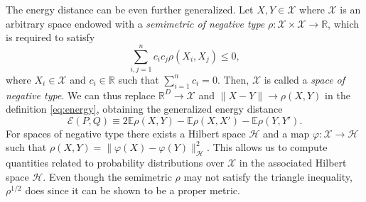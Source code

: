 \documentclass[aps,preprint,nofootinbib,floatfix]{revtex4-1}
\newcommand\Energy{\mathcal{E}}
\newcommand\E{\mathbb{E}}
\begin{document}
The energy distance can be even further generalized.
Let $X, Y \in \mathcal{X}$  where $\mathcal{X}$ is an arbitrary space endowed
with a \emph{semimetric of negative type}
$\rho: \mathcal{X}\times\mathcal{X} \to \mathbb{R}$, which is required
to satisfy
\begin{equation}
\label{eq:negative_type}
\sum_{i,j=1}^n c_i c_j \rho(X_i, X_j) \le 0,
\end{equation}
where $X_i \in \mathcal{X}$ and $c_i \in \mathbb{R}$ such that
$\sum_{i=1}^n c_i = 0$. Then, $\mathcal{X}$ is called a \emph{space of
negative type}.
We can thus replace $\mathbb{R}^D \to \mathcal{X}$ and 
$\| X - Y \| \to \rho(X , Y)$ in the definition \eqref{eq:energy}, obtaining
the generalized energy distance
\begin{equation}
\label{eq:energy3}
\Energy(P, Q) \equiv 2 \E \rho(X,Y) - \E \rho(X, X') - \E \rho(Y,Y').
\end{equation}
For spaces of negative type there exists a Hilbert space $\mathcal{H}$ and
a map $\varphi: \mathcal{X} \to
\mathcal{H}$ such that
$\rho(X, Y) = \| \varphi(X) - \varphi(Y) \|_{\mathcal{H}}^2$. This
allows us to compute quantities related to probability distributions over
$\mathcal{X}$ in the associated Hilbert space $\mathcal{H}$.
Even though the semimetric 
$\rho$ may not satisfy the triangle inequality, 
$\rho^{1/2}$ does since it can be shown to be a proper metric. 
\end{document}
